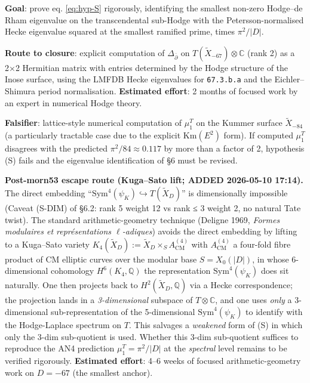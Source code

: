 \documentclass[
  11pt,
  a4paper,
]{amsart}
\begin{document}
\textbf{Goal}: prove eq. \eqref{eq:hyp-S} rigorously, identifying the smallest
non-zero Hodge--de Rham eigenvalue on the transcendental sub-Hodge with the
Petersson-normalised Hecke eigenvalue squared at the smallest ramified prime,
times \(\pi^2 / |D|\).

\textbf{Route to closure}: explicit computation of \(\Delta_{\bar\partial}\) on
\(T(\widetilde{X}_{-67}) \otimes \mathbb{C}\) (rank 2) as a 2×2 Hermitian matrix
with entries determined by the Hodge structure of the Inose surface, using the
LMFDB Hecke eigenvalues for \texttt{67.3.b.a} and the Eichler--Shimura period
normalisation. \textbf{Estimated effort}: 2 months of focused work by an expert in
numerical Hodge theory.

\textbf{Falsifier}: lattice-style numerical computation of \(\mu_1^T\) on the Kummer
surface \(\widetilde{X}_{-84}\) (a particularly tractable case due to the
explicit \(\mathrm{Km}(E^2)\) form). If computed \(\mu_1^T\) disagrees with the
predicted \(\pi^2/84 \approx 0.117\) by more than a factor of 2, hypothesis (S)
fails and the eigenvalue identification of §6 must be revised.

\textbf{Post-morn53 escape route (Kuga--Sato lift; ADDED 2026-05-10 17:14).} The
direct embedding ``\(\mathrm{Sym}^4(\psi_K) \hookrightarrow T(\widetilde{X}_D)\)'' is
dimensionally impossible (Caveat (S-DIM) of §6.2: rank 5 weight 12 vs rank ≤ 3
weight 2, no natural Tate twist). The standard arithmetic-geometry technique
(Deligne 1969, \emph{Formes modulaires et représentations \(\ell\)-adiques}) avoids the
direct embedding by lifting to a Kuga--Sato variety
\(K_4(\widetilde{X}_D) := \widetilde{X}_D \times_{S} A^{(4)}_{\mathrm{CM}}\)
with \(A^{(4)}_{\mathrm{CM}}\) a four-fold fibre product of CM elliptic curves
over the modular base \(S = X_0(|D|)\), in whose 6-dimensional cohomology
\(H^6(K_4, \mathbb{Q})\) the representation \(\mathrm{Sym}^4(\psi_K)\) does sit
naturally. One then projects back to \(H^2(\widetilde{X}_D, \mathbb{Q})\) via a
Hecke correspondence; the projection lands in a \emph{3-dimensional} subspace of
\(T \otimes \mathbb{C}\), and one uses \emph{only} a 3-dimensional sub-representation of
the 5-dimensional \(\mathrm{Sym}^4(\psi_K)\) to identify with the Hodge-Laplace
spectrum on \(T\). This salvages a \emph{weakened} form of (S) in which only the
3-dim sub-quotient is used. Whether this 3-dim sub-quotient suffices to
reproduce the AN4 prediction \(\mu_1^T = \pi^2 / |D|\) at the \emph{spectral} level
remains to be verified rigorously. \textbf{Estimated effort}: 4--6 weeks of focused
arithmetic-geometry work on \(D = -67\) (the smallest anchor).
\end{document}
